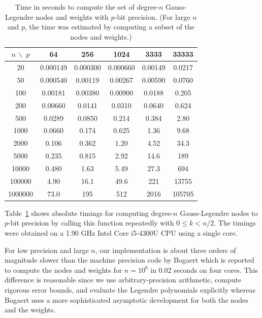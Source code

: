 \documentclass[11pt,a4paper]{article}
\begin{document}
\begin{table}[h!]
\begin{centering}
\begin{tabular}{ c | c c c c c }
$n\, \backslash \; p$ & 64 & 256 & 1024 & 3333 & 33333 \\ \hline
20  & 0.000149  &  0.000300  &  0.000660  &  0.00149  &  0.0217  \\ 
50  & 0.000540  &  0.00119  &  0.00267  &  0.00590  &  0.0760  \\ 
100  & 0.00181  &  0.00380  &  0.00900  &  0.0188  &  0.205  \\ 
200  & 0.00660  &  0.0141  &  0.0310  &  0.0640  &  0.624  \\ 
500  & 0.0289  &  0.0850  &  0.214  &  0.384  &  2.80  \\ 
1000  & 0.0660  &  0.174  &  0.625  &  1.36  &  9.68  \\ 
2000  & 0.106  &  0.362  &  1.20  &  4.52  &  34.3  \\ 
5000  & 0.235  &  0.815  &  2.92  &  14.6  &  189  \\ 
10000  & 0.480  &  1.63  &  5.49  &  27.3  &  694  \\ 
100000  & 4.90  &  16.1  &  49.6  &  221  &  13755  \\ 
1000000  & 73.0  &  195  &  512  &  2016  &  105705
\end{tabular}
\caption{Time in seconds to compute the set of degree-$n$ Gauss-Legendre nodes and weights with $p$-bit precision.
(For large $n$ and $p$, the time was estimated by computing a subset of the nodes and weights.)}
\label{tab:timings}
\end{centering}
\end{table}

Table~\ref{tab:timings} shows absolute timings for computing
degree-$n$ Gauss-Legendre nodes to $p$-bit precision
by calling this function repeatedly with $0 \le k < n / 2$.
The timings were obtained on a 1.90 GHz Intel Core i5-4300U CPU
using a single core.

For low precision and large $n$, our implementation
is about three orders of magnitude slower than the machine precision
code by Bogaert \cite{bogaert2014iteration}
which is reported to compute the nodes and weights for $n = 10^6$
in 0.02 seconds on four cores.
This difference is reasonable since we use arbitrary-precision arithmetic,
compute rigorous error bounds, and evaluate the Legendre polynomials
explicitly whereas Bogaert uses a more sophisticated
asymptotic development for both the nodes and the weights.
\end{document}
